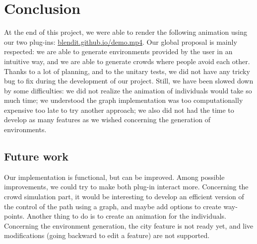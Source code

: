\section{Conclusion}

At the end of this project, we were able to render the following animation using our two plug-ins: \url{blendit.github.io/demo.mp4}. Our global proposal is mainly respected: we are able to generate environments provided by the user in an intuitive way, and we are able to generate crowds where people avoid each other. Thanks to a lot of planning, and to the unitary tests, we did not have any tricky bug to fix during the development of our project. Still, we have been slowed down by some difficulties: we did not realize the animation of individuals would take so much time;  we understood the graph implementation was too computationally expensive too late to try another approach; we also did not had the time to develop as many features as we wished concerning the generation of environments. 

\subsection*{Future work}

Our implementation is functional, but can be improved. Among possible improvements, we could try to make both plug-in interact more. Concerning the crowd simulation part, it would be interesting to develop an efficient version of the control of the path using a graph, and maybe add options to create way-points. Another thing to do is to create an animation for the individuals. Concerning the environment generation, the city feature is not ready yet, and live modifications (going backward to edit a feature) are not supported.

